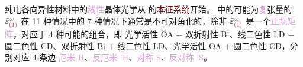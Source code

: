 \textcolor{PineGreen}{纯电各向异性}材料中的\textcolor{Plum}{线性}\textcolor{PineGreen}{晶体光学}从  的\textcolor{Maroon}{本征系统}开始。 中的可能为\textcolor{Plum}{复}张量的 $\bar{\bar{\varepsilon}}^{\;\! \mathcolor{gray}{\omega}}_{\textcolor{Maroon}{(1)}}$ 在 11 种情况中的 7 种情况下通常是不可对角化的，除非 $\bar{\bar{\varepsilon}}^{\;\! \mathcolor{gray}{\omega}}_{\textcolor{Maroon}{(1)}}$ 是一个\textcolor{Plum}{正规矩阵}，对应于 4 种可能的组合，即 \textcolor{NavyBlue}{光学活性 OA} $+$ \textcolor{NavyBlue}{双折射性 Bi}、\textcolor{NavyBlue}{线二色性 LD} $+$ \textcolor{NavyBlue}{圆二色性 CD}、\textcolor{NavyBlue}{双折射性 Bi} $+$ \textcolor{NavyBlue}{线二色性 LD}、\textcolor{NavyBlue}{光学活性 OA} $+$ \textcolor{NavyBlue}{圆二色性 CD}，分别对应 4 条边 \textcolor{Plum}{厄米 H}、\textcolor{Plum}{反厄米 $!$H}、\textcolor{Plum}{对称 S}、\textcolor{Plum}{反对称 $!$S}。

\clearpage

